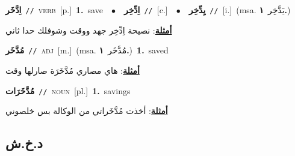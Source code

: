 \documentclass[10pt,a4paper,twoside]{article} %
\begin{document}
\begin{multicols}{2}
{\setlength\topsep{0pt}\textbf{\foreignlanguage{arabic}{اِدَّخَر}}\ {\color{gray}\texttt{//}\color{black}}\ \textsc{verb}\ [p.]\ \textbf{1.}~save\ \ $\bullet$\ \ \setlength\topsep{0pt}\textbf{\foreignlanguage{arabic}{اِدِّخِر}}\ {\color{gray}\texttt{//}\color{black}}\ [c.]\ \ $\bullet$\ \ \setlength\topsep{0pt}\textbf{\foreignlanguage{arabic}{يِدِّخِر}}\ {\color{gray}\texttt{//}\color{black}}\ [i.]\ \color{gray}(msa. \foreignlanguage{arabic}{يَدَّخِر}~\foreignlanguage{arabic}{\textbf{١.}})\color{black}\  \begin{flushright}\color{gray}\foreignlanguage{arabic}{\textbf{\underline{\foreignlanguage{arabic}{أمثلة}}}: نصيحة اِدِّخِر جهد ووقت وشوفلك حدا ثاني}\end{flushright}\color{black}} \vspace{2mm}

{\setlength\topsep{0pt}\textbf{\foreignlanguage{arabic}{مُدَّخَر}}\ {\color{gray}\texttt{//}\color{black}}\ \textsc{adj}\ [m.]\ \color{gray}(msa. \foreignlanguage{arabic}{مُدَّخَر}~\foreignlanguage{arabic}{\textbf{١.}})\color{black}\ \textbf{1.}~saved\  \begin{flushright}\color{gray}\foreignlanguage{arabic}{\textbf{\underline{\foreignlanguage{arabic}{أمثلة}}}: هاي مصاري مُدَّخَرَة صارلها وقت}\end{flushright}\color{black}} \vspace{2mm}

{\setlength\topsep{0pt}\textbf{\foreignlanguage{arabic}{مُدَّخَرَات}}\ {\color{gray}\texttt{//}\color{black}}\ \textsc{noun}\ [pl.]\ \textbf{1.}~savings\  \begin{flushright}\color{gray}\foreignlanguage{arabic}{\textbf{\underline{\foreignlanguage{arabic}{أمثلة}}}: أخذت مُدَّخَراتي من الوكالة بس خلصوني}\end{flushright}\color{black}} \vspace{2mm}

\vspace{-3mm}
\subsection*{\color{blue}\foreignlanguage{arabic}{د.خ.ش}\color{blue}{ (ntws)}} 


\end{multicols}
\end{document}
